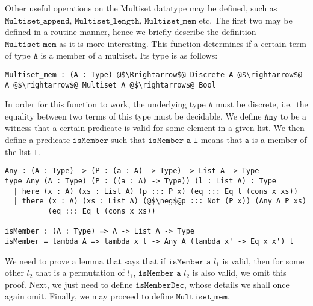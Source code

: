 \documentclass[12pt,twoside,maitrise]{dms}
\theoremstyle{definition}
\numberwithin{equation}{section}
\numberwithin{table}{chapter}
\numberwithin{figure}{chapter}
\newcommand\fn[1] {\texttt{#1}}
\begin{document}
Other useful operations on the Multiset datatype may be defined, such as
$\fn{Multiset\_append}$, $\fn{Multiset\_length}$, $\fn{Multiset\_mem}$ etc. The
first two may be defined in a routine manner, hence we briefly describe the
definition $\fn{Multiset\_mem}$ as it is more interesting. This function
determines if a certain term of type $\fn{A}$ is a member of a multiset. Its
type is as follows:

\begin{verbatim}
Multiset_mem : (A : Type) @$\Rrightarrow$@ Discrete A @$\rightarrow$@ A @$\rightarrow$@ Multiset A @$\rightarrow$@ Bool
\end{verbatim}

In order for this function to work, the underlying type $\fn{A}$ must be
discrete, i.e.\ the equality between two terms of this type must be decidable.
We define $\fn{Any}$ to be a witness that a certain predicate is valid for some
element in a given list. We then define a predicate $\fn{isMember}$ such that
$\fn{isMember a l}$ means that $\fn{a}$ is a member of the list $\fn{l}$.

\begin{verbatim}
Any : (A : Type) -> (P : (a : A) -> Type) -> List A -> Type
type Any (A : Type) (P : ((a : A) -> Type)) (l : List A) : Type
  | here (x : A) (xs : List A) (p ::: P x) (eq ::: Eq l (cons x xs))
  | there (x : A) (xs : List A) (@$\neg$@p ::: Not (P x)) (Any A P xs)
          (eq ::: Eq l (cons x xs))

isMember : (A : Type) => A -> List A -> Type
isMember = lambda A => lambda x l -> Any A (lambda x' -> Eq x x') l
\end{verbatim}

We need to prove a lemma that says that if $\fn{isMember a $l_1$}$ is valid,
then for some other $\fn{$l_2$}$ that is a permutation of $\fn{$l_1$}$,
$\fn{isMember a $l_2$}$ is also valid, we omit this proof. Next, we just need to
define $\fn{isMemberDec}$, whose details we shall once again omit. Finally, we
may proceed to define $\fn{Multiset\_mem}$.
\end{document}
